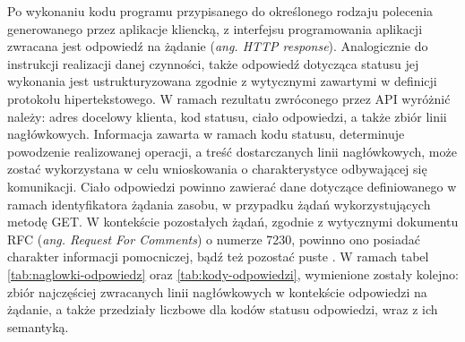 Po wykonaniu kodu programu przypisanego do określonego rodzaju polecenia generowanego przez aplikacje kliencką, z interfejsu programowania aplikacji zwracana jest odpowiedź na żądanie (\textit{ang. HTTP response}). Analogicznie do instrukcji realizacji danej czynności, także odpowiedź dotycząca statusu jej wykonania jest ustrukturyzowana zgodnie z wytycznymi zawartymi w definicji protokołu hipertekstowego. W ramach rezultatu zwróconego przez API wyróżnić należy: adres docelowy klienta, kod statusu, ciało odpowiedzi, a także zbiór linii nagłówkowych. Informacja zawarta w ramach kodu statusu, determinuje powodzenie realizowanej operacji, a treść dostarczanych linii nagłówkowych, może zostać wykorzystana w celu wnioskowania o charakterystyce odbywającej się komunikacji. Ciało odpowiedzi powinno zawierać dane dotyczące definiowanego w ramach identyfikatora żądania zasobu, w przypadku żądań wykorzystujących metodę GET. W kontekście pozostałych żądań, zgodnie z wytycznymi dokumentu RFC (\textit{ang. Request For Comments}) o numerze 7230, powinno ono posiadać charakter informacji pomocniczej, bądź też pozostać puste \cite{rfc7230}. W ramach tabel \ref{tab:naglowki-odpowiedz} oraz \ref{tab:kody-odpowiedzi}, wymienione zostały kolejno: zbiór najczęściej zwracanych linii nagłówkowych w kontekście odpowiedzi na żądanie, a także przedziały liczbowe dla kodów statusu odpowiedzi, wraz z ich semantyką.

